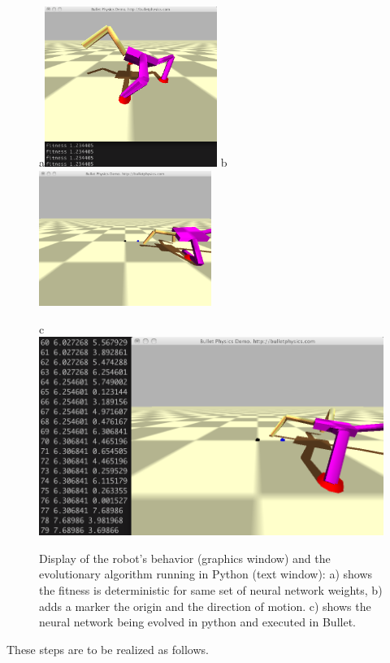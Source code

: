 \documentclass[12pt]{article}
\begin{document}
\begin{figure}
\centerline{
a\includegraphics[width=0.5\textwidth]{Fig1a}
b\includegraphics[width=0.5\textwidth]{Fig1b}}
\centerline{
c\includegraphics[width=1.0\textwidth]{Fig1c}
}
\caption{Display of the robot's behavior (graphics window) and the evolutionary algorithm running in Python (text window): a) shows the fitness is deterministic for same set of neural network weights, b) adds a marker the origin and the direction of motion. c) shows the neural network being evolved in python and executed in Bullet.}
\label{Fig1}
\end{figure}

These steps are to be realized as follows.
\end{document}
